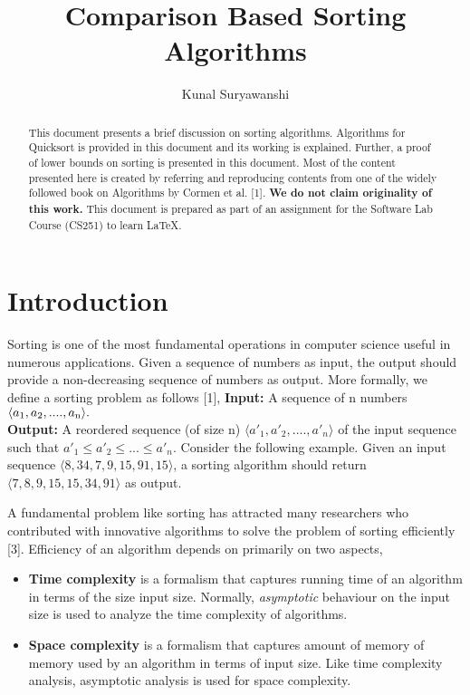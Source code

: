 \documentclass[a4paper, 10pt,twocolumn]{article}
\title{Comparison Based Sorting Algorithms}
\author{Kunal Suryawanshi}
\date{}
\begin{document}
\maketitle
\begin{abstract}
This document presents a brief discussion on sorting algorithms. Algorithms for Quicksort is provided in this document and its working is explained. Further, a proof of lower bounds on sorting is presented in this document. Most of the content presented here is created by referring and reproducing contents from one of the widely followed book on
Algorithms by Cormen et al. [1]. \textbf{We do not claim originality of this work.} This document is prepared as part of an assignment for the Software Lab Course (CS251) to learn \LaTeX .\newline
{}
\end{abstract}    
\section{Introduction}
Sorting is one of the most fundamental operations in computer science useful in numerous applications. Given a sequence of numbers as input, the output should provide a non-decreasing sequence of numbers as output. More formally, we define a sorting problem as follows [1], \newline
\textbf{Input:} A sequence of n numbers $\langle a\textsubscript{1}, a\textsubscript{2}, .... , a\textsubscript{n}\rangle.$\\
\textbf{Output:} A reordered sequence (of size n) $\langle a'_1, a'_2, .... , a'_n \rangle$
of the input sequence such that $a'_1 \leq a'_2 \leq ... \leq a'_n.$
\newline
Consider the following example. Given an input
sequence $\langle8, 34, 7, 9, 15, 91, 15\rangle$, a sorting algorithm
should return $\langle7, 8, 9, 15, 15, 34, 91\rangle$ as output.
\par
A fundamental problem like sorting has attracted many researchers who contributed with innovative
algorithms to solve the problem of sorting efficiently [3]. Efficiency of an algorithm depends on
primarily on two aspects,
\begin{itemize}
    \item \textbf{Time complexity} is a formalism that captures running time of an algorithm in terms of the size input size. Normally, \textit{asymptotic} behaviour on the input size is used to analyze the time complexity of algorithms.
    \item \textbf{Space complexity} is a formalism that captures amount of memory of memory used by an algorithm
in terms of input size. Like time complexity
analysis, asymptotic analysis is used for space
complexity.
\end{itemize}
\end{document}
